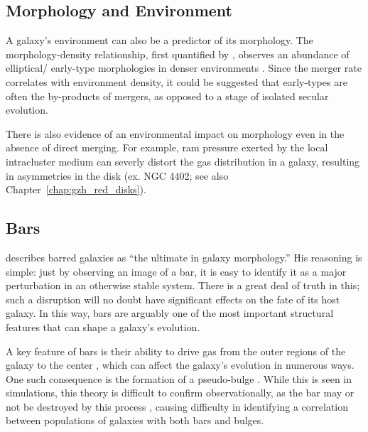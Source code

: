\subsection{Morphology and Environment}

A galaxy's environment can also be a predictor of its morphology. The morphology-density relationship, first quantified by \citet{Dressler1980}, observes an abundance of elliptical/ early-type morphologies in denser environments \citep{deSouza1982,Postman1984}. Since the merger rate correlates with environment density, it could be suggested that early-types are often the by-products of mergers, as opposed to a stage of isolated secular evolution. 

There is also evidence of an environmental impact on morphology even in the absence of direct merging. For example, ram pressure \citep{Gunn1972} exerted by the local intracluster medium can severly distort the gas distribution in a galaxy, resulting in asymmetries in the disk (ex. NGC 4402; see also Chapter~\ref{chap:gzh_red_disks}).  

\subsection{Bars}
\citet{Buta2013} describes barred galaxies as ``the ultimate in galaxy morphology.'' His reasoning is simple: just by observing an image of a bar, it is easy to identify it as a major perturbation in an otherwise stable system. There is a great deal of truth in this; such a disruption will no doubt have significant effects on the fate of its host galaxy. In this way, bars are arguably one of the most important structural features that can shape a galaxy's evolution. 

A key feature of bars is their ability to drive gas from the outer regions of the galaxy to the center \citep{Athanassoula1992,Friedli1993,Sellwood1993,Shlosman1989,Ann2005}, which can affect the galaxy's evolution in numerous ways. One such consequence is the formation of a pseudo-bulge \citep{Kormendy2004,Sheth2005}. While this is seen in simulations, this theory is difficult to confirm observationally, as the bar may or not be destroyed by this process \citep{Athanassoula2005}, causing difficulty in identifying a correlation between populations of galaxies with both bars and bulges. 


